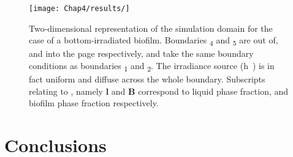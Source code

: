 \begin{figure}[tp]
    \centering
    \texttt{[image: Chap4/results/]}
    \caption{Two-dimensional representation of the simulation domain for the case of a bottom-irradiated biofilm. Boundaries \si{\Gamma_4} and \si{\Gamma_5} are out of, and into the page respectively, and take the same boundary conditions as boundaries \si{\Gamma_1} and \si{\Gamma_2}. The irradiance source (\si{h \nu}) is in fact uniform and diffuse across the whole boundary. Subscripts relating to \si{\alpha}, namely \textbf{l} and \textbf{B} correspond to liquid phase fraction, and biofilm phase fraction respectively.} 
    \label{fig:2d_above}
\end{figure}

















\section{Conclusions}